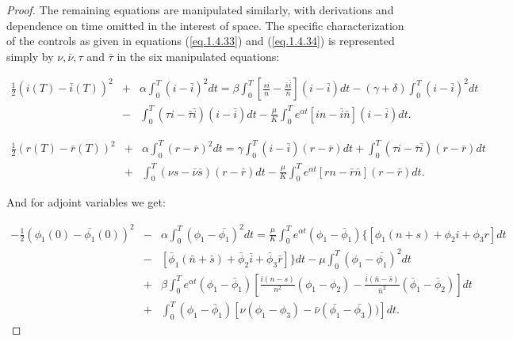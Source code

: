 \begin{proof}
The remaining equations are manipulated similarly, with derivations and 
dependence on time omitted in the interest of space. The specific 
characterization of the controls as given in equations (\ref{eq.1.4.33}) and 
(\ref{eq.1.4.34}) is represented simply by $\nu,\bar{\nu},\tau$ and 
$\bar{\tau}$ in the six manipulated equations:

\begin{eqnarray}
\frac{1}{2}(i(T)-\bar{i}(T))^2&+&\alpha\int_{0}^{T}(i-\bar{i})^2dt=\beta\int_{0}^{T}\left[\frac{si}{n}-\frac{\bar{s}\bar{i}}{\bar{n}}\right](i-\bar{i})dt-(\gamma+\delta)\int_{0}^{T}(i-\bar{i})^2dt\nonumber\\
&-&\int_{0}^{T}(\tau 
i-\bar{\tau}\bar{i})(i-\bar{i})dt-\frac{\mu}{K}\int_{0}^{T} e^{\alpha 
t}\left[in-\bar{i}\bar{n}\right](i-\bar{i})dt. \label{eq.1.4.36}
\end{eqnarray}

\begin{eqnarray}
\frac{1}{2}(r(T)-\bar{r}(T))^2&+&\alpha\int_{0}^{T}(r-\bar{r})^2dt=\gamma\int_{0}^{T}(i-\bar{i})(r-\bar{r})dt+\int_{0}^{T}(\tau
 i-\bar{\tau}\bar{i})(r-\bar{r})dt\nonumber\\
&+&\int_{0}^{T}(\nu s-\bar{\nu}\bar{s})(r-\bar{r})dt-\frac{\mu}{K}\int_{0}^{T} 
e^{\alpha t}\left[rn-\bar{r}\bar{n}\right](r-\bar{r})dt. \label{eq.1.4.37}
\end{eqnarray}

And for adjoint variables we get:

\begin{eqnarray}
-\frac{1}{2}(\phi_1(0)-\bar{\phi_1}(0))^2&-&\alpha\int_{0}^{T}(\phi_1-\bar{\phi_1})^2dt=\frac{\mu}{K}\int_{0}^{T}e^{\alpha
 t}(\phi_1-\bar{\phi}_1)\{[\phi_1(n+s)+\phi_2 i +\phi_3 r]dt\nonumber\\
&-&[\bar{\phi}_1(\bar{n}+\bar{s})+\bar{\phi}_2 \bar{i} +\bar{\phi}_3 
\bar{r}]\}dt-\mu\int_{0}^{T}(\phi_1-\bar{\phi_1})^2dt \nonumber\\
&+&\beta\int_{0}^{T}e^{\alpha 
t}(\phi_1-\bar{\phi}_1)\left[\frac{i(n-s)}{n^2}(\phi_1-\phi_2)-\frac{\bar{i}(\bar{n}-\bar{s})}{\bar{n}^2}(\bar{\phi}_1-\bar{\phi}_2)\right]dt
 \nonumber\\
&+&\int_{0}^{T} 
(\phi_1-\bar{\phi}_1)[\nu(\phi_1-\phi_3)-\bar{\nu}(\bar{\phi_1}-\bar{\phi_3}))]dt.
 \label{eq.1.4.38}
\end{eqnarray}


\end{proof}
